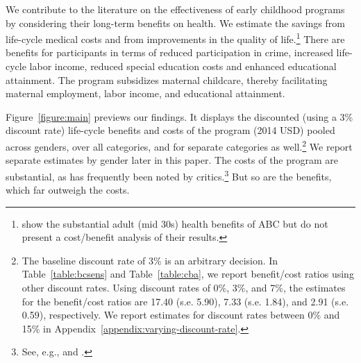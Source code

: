 We contribute to the literature on the effectiveness of early childhood programs by considering their long-term benefits on health. We estimate the savings from life-cycle medical costs and from improvements in the quality of life.\footnote{\cite{Campbell_Conti_etal_2014_EarlyChildhoodInvestments} show the substantial adult (mid 30s) health benefits of ABC but do not present a cost/benefit analysis of their results.} There are benefits for participants in terms of reduced participation in crime, increased life-cycle labor income, reduced special education costs and enhanced educational attainment. The program subsidizes maternal childcare, thereby facilitating maternal employment, labor income, and educational attainment.

Figure~\ref{figure:main} previews our findings. It displays the discounted (using a 3\% discount rate) life-cycle benefits and costs of the program (2014 USD) pooled across genders, over all categories, and for separate categories as well.\footnote{The baseline discount rate of 3\% is an arbitrary decision. In Table~\ref{table:bcsens} and Table~\ref{table:cba}, we report benefit/cost ratios using other discount rates. Using discount rates of 0\%, 3\%, and 7\%, the estimates for the benefit/cost ratios are 17.40 (s.e. 5.90), 7.33 (s.e. 1.84), and 2.91 (s.e. 0.59), respectively. We report estimates for discount rates between 0\% and 15\% in  Appendix~\ref{appendix:varying-discount-rate}.} We report separate estimates by gender later in this paper. The costs of the program are substantial, as has frequently been noted by critics.\footnote{See, e.g., \citet{Fox_News_2014_Head_Start_Effects} and \citet{Whitehurst_2014_Senate_Testimony}.} But so are the benefits, which far outweigh the costs.

